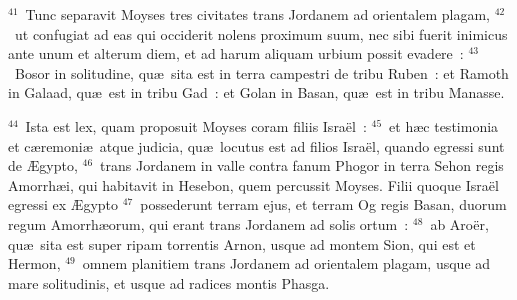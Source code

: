 ${}^{41}$~Tunc separavit Moyses tres civitates trans Jordanem ad orientalem plagam,
${}^{42}$~ut confugiat ad eas qui occiderit nolens proximum suum, nec sibi fuerit inimicus ante unum et alterum diem, et ad harum aliquam urbium possit evadere~:
${}^{43}$~Bosor in solitudine, qu\ae\ sita est in terra campestri de tribu Ruben~: et Ramoth in Galaad, qu\ae\ est in tribu Gad~: et Golan in Basan, qu\ae\ est in tribu Manasse.


${}^{44}$~Ista est lex, quam proposuit Moyses coram filiis Isra\"el~:
${}^{45}$~et h\ae c testimonia et c\ae remoni\ae\ atque judicia, qu\ae\ locutus est ad filios Isra\"el, quando egressi sunt de \AE gypto,
${}^{46}$~trans Jordanem in valle contra fanum Phogor in terra Sehon regis Amorrh\ae i, qui habitavit in Hesebon, quem percussit Moyses. Filii quoque Isra\"el egressi ex \AE gypto
${}^{47}$~possederunt terram ejus, et terram Og regis Basan, duorum regum Amorrh\ae orum, qui erant trans Jordanem ad solis ortum~:
${}^{48}$~ab Aro\"er, qu\ae\ sita est super ripam torrentis Arnon, usque ad montem Sion, qui est et Hermon,
${}^{49}$~omnem planitiem trans Jordanem ad orientalem plagam, usque ad mare solitudinis, et usque ad radices montis Phasga.

